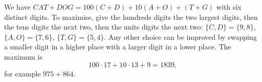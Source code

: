 We have $CAT+DOG=100(C+D)+10(A+O)+(T+G)$ with six distinct digits. To maximise, give the hundreds digits the two largest digits, then the tens digits the next two, then the units digits the next two: $\{C,D\}=\{9,8\}$, $\{A,O\}=\{7,6\}$, $\{T,G\}=\{5,4\}$. Any other choice can be improved by swapping a smaller digit in a higher place with a larger digit in a lower place. The maximum is
\[
100\cdot17+10\cdot13+9=\boxed{1839},
\]
for example $975+864$.
